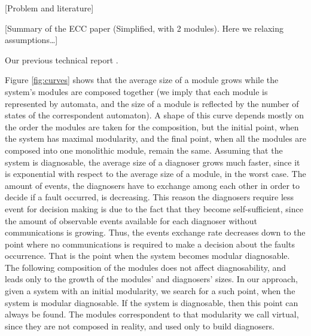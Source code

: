 \documentclass[a4paper, 10pt, conference]{ieeeconf}
\begin{document}
[Problem and literature]

[Summary of the ECC paper (Simplified, with 2 modules). Here we relaxing
assumptions\ldots]

Our previous technical report \cite{myadzelets_virtual_2013}.

Figure \ref{fig:curves} shows that the average size of a module grows while the
system's modules are composed together (we imply that each module is represented
by automata, and the size of a module is reflected by the number of states of
the correspondent automaton).
A shape of this curve depends mostly on the order the modules are taken for the
composition, but the initial point, when the system has maximal modularity, and
the final point, when all the modules are composed into one monolithic module,
remain the same. Assuming that the system is diagnosable, the average size of a
diagnoser grows much faster, since it is exponential with respect to the average
size of a module, in the worst case.
The amount of events, the diagnosers have to exchange among each other in order
to decide if a fault occurred, is decreasing. This reason the diagnosers require
less event for decision making is due to the fact that they become
self-sufficient, since the amount of observable events available for each
diagnoser without communications is growing. Thus, the events exchange rate
decreases down to the point where no communications is required to make a
decision about the faults occurrence. That is the point when the system becomes
modular diagnosable. The following composition of the modules does not affect
diagnosability, and leads only to the growth of the modules' and diagnosers'
sizes. In our approach, given a system with an initial modularity, we search for
a such point, when the system is modular diagnosable. If the system is
diagnosable, then this point can always be found. The modules correspondent to
that modularity we call virtual, since they are not composed in reality, and
used only to build diagnosers.
\end{document}
